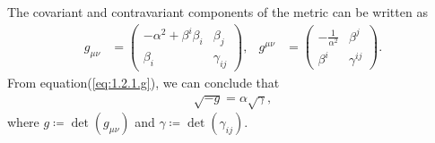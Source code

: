 The covariant and contravariant components of the metric can be written as
\begin{align}\label{eq:1.2.1.g}
    g_{\mu\nu} &= 
    \begin{pmatrix}
        - \alpha^2 + \beta^i \beta_i & \beta_j \\
        \beta_i & \gamma_{ij}
    \end{pmatrix}, &
    g^{\mu\nu} &= 
    \begin{pmatrix}
        - \frac{1}{\alpha^2} & \beta^j \\
        \beta^i & \gamma^{ij}
    \end{pmatrix}.
\end{align}
From equation(\ref{eq:1.2.1.g}), we can conclude that
\begin{align}
    \sqrt{-g} = \alpha \sqrt{\gamma},
\end{align}
where $g \coloneqq \det{\left(g_{\mu\nu}\right)}$ and $\gamma \coloneqq \det{\left(\gamma_{ij}\right)}$.

